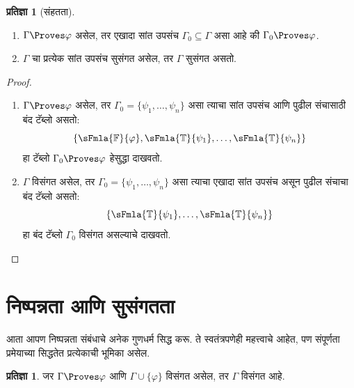 \documentclass[11pt,a4paper,openany]{book}
\theoremstyle{definition}
\newtheorem{prop}[defn]{प्रतिज्ञा}
\newcommand{\True}{\ensuremath{\mathbb{T}}}
\newcommand{\False}{\ensuremath{\mathbb{F}}}
\begin{document}
\begin{prop}[संहतता]
  \label{fol:tab:ptn:prop:proves-compact}
  \begin{enumerate}
  \item $\Gamma \Proves \varphi$ असेल, तर एखादा सांत उपसंच $\Gamma_0
    \subseteq \Gamma$ असा आहे की $\Gamma_0 \Proves \varphi$.
  \item $\Gamma$ चा प्रत्येक सांत उपसंच सुसंगत असेल, तर $\Gamma$ सुसंगत
    असतो.
  \end{enumerate}
\end{prop}

\begin{proof}
  \begin{enumerate}
    \item $\Gamma \Proves \varphi$ असेल, तर $\Gamma_0 =
      \{\psi_1, \dots, \psi_n\}$ असा त्याचा सांत उपसंच आणि पुढील संचासाठी बंद टॅब्लो असतो:
      \[
      \{\sFmla{\False}{\varphi}, \sFmla{\True}{\psi_1}, \dots, \sFmla{\True}{\psi_n}\}
      \]
      हा टॅब्लो $\Gamma_0 \Proves \varphi$ हेसुद्धा दाखवतो.
    \item $\Gamma$ विसंगत असेल, तर
      $\Gamma_0 = \{\psi_1, \dots, \psi_n\}$ असा त्याचा एखादा सांत उपसंच असून पुढील
      संचाचा बंद टॅब्लो असतो:
      \[
      \{\sFmla{\True}{\psi_1}, \dots, \sFmla{\True}{\psi_n}\}
      \]
      हा बंद टॅब्लो $\Gamma_0$ विसंगत असल्याचे दाखवतो.
  \end{enumerate}
\end{proof}












\section{निष्पन्नता आणि सुसंगतता}\label{fol:tab:prv:sec}

आता आपण निष्पन्नता संबंधाचे अनेक गुणधर्म सिद्ध करू. ते स्वतंत्रपणेही
महत्त्वाचे आहेत, पण संपूर्णता प्रमेयाच्या सिद्धतेत प्रत्येकाची भूमिका असेल.

\begin{prop}\label{fol:tab:prv:prop:provability-contr}
  जर $\Gamma \Proves \varphi$ आणि $\Gamma \cup \{\varphi\}$ विसंगत असेल, तर
  $\Gamma$ विसंगत आहे.
\end{prop}
\end{document}
